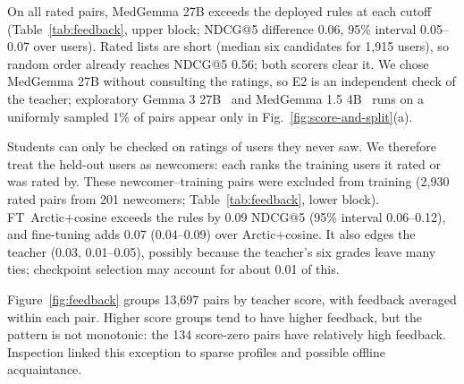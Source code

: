 \documentclass[runningheads,a4paper]{llncs}
\newcommand{\model}[1]{{\hyphenpenalty=10000 \exhyphenpenalty=10000 \textsf{#1}}}
\begin{document}
On all rated pairs, MedGemma 27B exceeds the deployed rules at each cutoff
(Table~\ref{tab:feedback}, upper block; NDCG@5 difference 0.06, 95\% interval
0.05--0.07 over users).
Rated lists are short (median six candidates for 1,915 users), so random order
already reaches NDCG@5 0.56; both scorers clear it. We chose MedGemma 27B
without consulting the ratings, so E2 is an independent check of the teacher;
exploratory Gemma 3 27B~\cite{gemmateam2025gemma3} and MedGemma 1.5
4B~\cite{sellergren2026medgemma15} runs
on a uniformly sampled 1\% of pairs appear only in
Fig.~\ref{fig:score-and-split}(a).

Students can only be checked on ratings of users they never saw. We therefore treat
the held-out users as newcomers: each ranks the training users it rated or was
rated by. These newcomer--training pairs were excluded from training (2,930 rated
pairs from 201 newcomers; Table~\ref{tab:feedback}, lower block). \model{FT~Arctic+cosine} exceeds the rules by
0.09 NDCG@5 (95\% interval 0.06--0.12), and fine-tuning adds 0.07 (0.04--0.09)
over \model{Arctic+cosine}. It also edges the teacher (0.03, 0.01--0.05),
possibly because the teacher's six grades leave many ties; checkpoint selection
may account for about 0.01 of this.

Figure~\ref{fig:feedback} groups 13,697 pairs by teacher score, with
feedback averaged within each pair. Higher score groups tend to have higher
feedback, but the pattern is not monotonic: the 134 score-zero pairs have
relatively high feedback. Inspection linked this exception to sparse profiles
and possible offline acquaintance.
\end{document}

